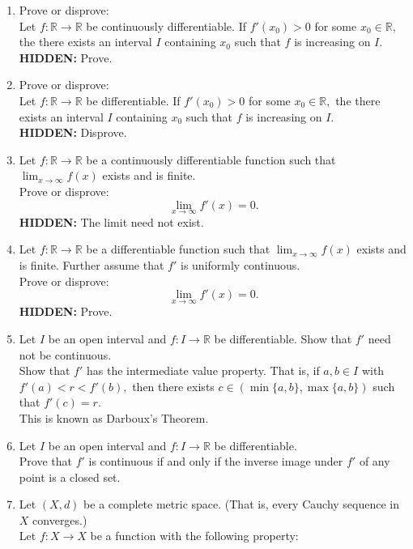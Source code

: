 \documentclass[12pt]{article}
\theoremstyle{definition}
\numberwithin{thm}{section}
\newcommand{\hint}[1]{\textbf{HIDDEN:} {\color[rgb]{0.95, 0.95, 0.95}#1}}
\begin{document}
\begin{enumerate}
	\item Prove or disprove:\\
	Let $f:\mathbb{R} \to \mathbb{R}$ be continuously differentiable. If $f'(x_0) > 0$ for some $x_0 \in \mathbb{R},$ the there exists an interval $I$ containing $x_0$ such that $f$ is increasing on $I.$\\
	\hint{Prove.}
	\item Prove or disprove:\\
	Let $f:\mathbb{R} \to \mathbb{R}$ be differentiable. If $f'(x_0) > 0$ for some $x_0 \in \mathbb{R},$ the there exists an interval $I$ containing $x_0$ such that $f$ is increasing on $I.$\\
	\hint{Disprove.}
	\item Let $f:\mathbb{R} \to \mathbb{R}$ be a continuously differentiable function such that $\displaystyle\lim_{x\to \infty}f(x)$ exists and is finite.\\
	Prove or disprove:
	\begin{equation*} 
		\lim_{x\to \infty}f'(x) = 0.
	\end{equation*}
	\hint{The limit need not exist.}
	\item Let $f:\mathbb{R} \to \mathbb{R}$ be a differentiable function such that $\displaystyle\lim_{x\to \infty}f(x)$ exists and is finite. Further assume that $f'$ is uniformly continuous. \\
	Prove or disprove:
	\begin{equation*} 
		\lim_{x\to \infty}f'(x) = 0.
	\end{equation*}
	\hint{Prove.}
	\item Let $I$ be an open interval and $f:I\to \mathbb{R}$ be differentiable. Show that $f'$ need not be continuous.\\
	Show that $f'$ has the intermediate value property. That is, if $a, b \in I$ with $f'(a) < r < f'(b),$ then there exists $c \in (\min\{a, b\}, \max\{a, b\})$ such that $f'(c) = r.$\\
	This is known as Darboux's Theorem.
	\item Let $I$ be an open interval and $f:I \to \mathbb{R}$ be differentiable.\\
	Prove that $f'$ is continuous if and only if the inverse image under $f'$ of any point is a closed set.
	\item Let $(X, d)$ be a complete metric space. (That is, every Cauchy sequence in $X$ converges.)\\
	Let $f:X \to X$ be a function with the following property:\\

\end{enumerate}
\end{document}
